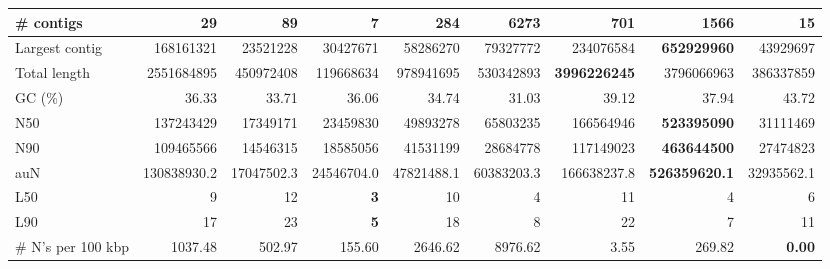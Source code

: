 \documentclass[12pt,a4paper]{article}
\begin{document}
\begin{table}[ht]
\begin{center}
\begin{tabular}{|l*{8}{|r}|}
\# contigs & 29 & 89 & 7 & 284 & 6273 & 701 & 1566 & 15 \\ \hline
Largest contig & 168161321 & 23521228 & 30427671 & 58286270 & 79327772 & 234076584 & {\bf 652929960} & 43929697 \\ \hline
Total length & 2551684895 & 450972408 & 119668634 & 978941695 & 530342893 & {\bf 3996226245} & 3796066963 & 386337859 \\ \hline
GC (\%) & 36.33 & 33.71 & 36.06 & 34.74 & 31.03 & 39.12 & 37.94 & 43.72 \\ \hline
N50 & 137243429 & 17349171 & 23459830 & 49893278 & 65803235 & 166564946 & {\bf 523395090} & 31111469 \\ \hline
N90 & 109465566 & 14546315 & 18585056 & 41531199 & 28684778 & 117149023 & {\bf 463644500} & 27474823 \\ \hline
auN & 130838930.2 & 17047502.3 & 24546704.0 & 47821488.1 & 60383203.3 & 166638237.8 & {\bf 526359620.1} & 32935562.1 \\ \hline
L50 & 9 & 12 & {\bf 3} & 10 & 4 & 11 & 4 & 6 \\ \hline
L90 & 17 & 23 & {\bf 5} & 18 & 8 & 22 & 7 & 11 \\ \hline
\# N's per 100 kbp & 1037.48 & 502.97 & 155.60 & 2646.62 & 8976.62 & 3.55 & 269.82 & {\bf 0.00} \\ \hline
\end{tabular}
\end{center}
\end{table}
\end{document}
